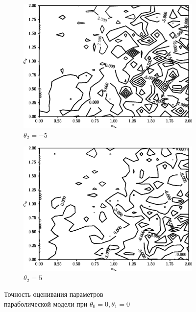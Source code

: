 \begin{figure}[p]
  \begin{subfigure}[b]{\linewidth}
    \centering
    \includegraphics[width=135mm]{fig/nonlinear/quadratic/a-0_b-0_c--5.png}
    \caption{\( \theta_2 = -5 \)}
  \end{subfigure}

  \vspace{2\baselineskip}
  \begin{subfigure}[b]{\linewidth}
    \centering
    \includegraphics[width=135mm]{fig/nonlinear/quadratic/a-0_b-0_c-5.png}
    \caption{\( \theta_2 = 5 \)}
  \end{subfigure}

  \vspace{\baselineskip}
    \caption{
      Точность оценивания параметров \\
      параболической модели при \( \theta_0 = 0, \theta_1 = 0 \)
    }\label{fig:comparison_nonlinear_quadratic_a-0_b-0}
\end{figure}

